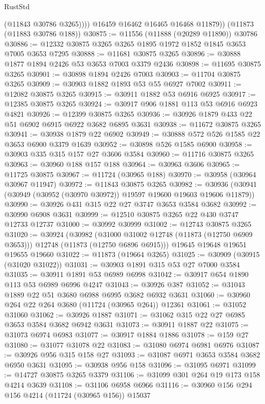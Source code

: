 \begin{lexlean}{RustStd}
\begin{coremodule}
              (@11843 @30786 @3265))))
        @16459
        @16462
        @16465
        @16468
        @11879))
    (@11873 (@11883 @30786 @188))
@30875 := @11556 (@11888 (@20289 @11890)) @30786
@30886 := @12332 @30875 @3265 @3265 @1895 @1972 @1852 @1845 @3653 @7005 @3653 @7295
@30888 := @11681 @30875 @3265
@30896 := @30888 @1877 @1894 @2426 @53 @3653 @7003 @3379 @2436
@30898 := @11695 @30875 @3265
@30901 := @30898 @1894 @2426 @7003
@30903 := @11704 @30875 @3265
@30909 := @30903 @1882 @1893 @53 @55 @6927 @7002
@30911 := @12082 @30875 @3265
@30915 := @30911 @1882 @53 @6916 @6925
@30917 := @12385 @30875 @3265
@30924 := @30917 @906 @1881 @113 @53 @6916 @6923 @4821
@30926 := @12399 @30875 @3265
@30936 := @30926 @1879 @433 @22 @51 @6902 @6915 @6922 @3682 @6895 @3631
@30938 := @11672 @30875 @3265
@30941 := @30938 @1879 @22 @6902
@30949 := @30888 @572 @526 @1585 @22 @3653 @6900 @3379 @1639
@30952 := @30898 @526 @1585 @6900
@30958 := @30903 @335 @315 @157 @27 @3606 @3584
@30960 := @11716 @30875 @3265
@30963 := @30960 @188 @157 @188
@30964 := @30963 @3606
@30965 := @11725 @30875
@30967 := @11724 (@30965 @188)
@30970 := @30958 (@30964 @30967 @11947)
@30972 := @11843 @30875 @3265
@30982 := @30936 (@30941 (@30949 (@30952 (@30970 @30972)) @19597 @19600 @19603 @19606 @11879))
@30990 := @30926 @431 @315 @22 @27 @3747 @3653 @3584 @3682
@30992 := @30990 @6908 @3631
@30999 := @12510 @30875 @3265 @22 @430 @3747 @12733 @12737
@31000 := @30992 @30999
@31002 := @12743 @30875 @3265
@31020 := @30924
    (@30982
      (@31000 @31002 @12748 (@11873 (@12750 @6909 @3653)))
      @12748
      (@11873 (@12750 @6896 @6915)))
    @19645
    @19648
    @19651
    @19655
    @19660
@31022 := @11873 (@19664 @3265)
@31025 := @30909 (@30915 (@31020 @31022))
@31031 := @30903 @1891 @315 @53 @27 @7000 @3584
@31035 := @30911 @1891 @53 @6989 @6998
@31042 := @30917 @654 @1890 @113 @53 @6989 @6996 @4247
@31043 := @30926 @387
@31052 := @31043 @1889 @22 @51 @3680 @6988 @6995 @3682 @6932 @3631
@31060 := @30960 @264 @22 @264 @3680 (@11724 (@30965 @264)) @12361
@31061 := @31052 @31060
@31062 := @30926 @1887
@31071 := @31062 @315 @22 @27 @6985 @3653 @3584 @3682 @6942 @3631
@31073 := @30911 @1887 @22
@31075 := @31073 @6974 @6983
@31077 := @30917 @1884 @1886
@31078 := @159 @27
@31080 := @31077 @31078 @22
@31083 := @31080 @6974 @6981 @6976
@31087 := @30926 @956 @315 @158 @27
@31093 := @31087 @6971 @3653 @3584 @3682 @6950 @3631
@31095 := @30938 @956 @158
@31096 := @31095 @6971
@31099 := @14727 @30875 @3265 @3379
@31106 := @31099 @301 @264 @19 @173 @158 @4214 @3639
@31108 := @31106 @6958 @6966
@31116 := @30960 @156 @294 @156 @4214 (@11724 (@30965 @156)) @15037

\end{coremodule}
\end{lexlean}
